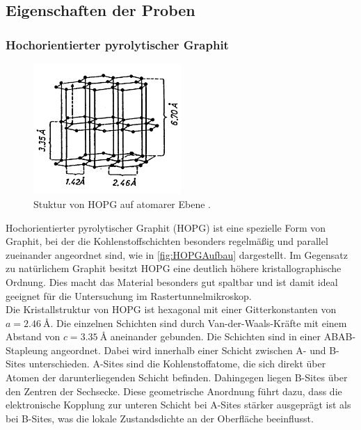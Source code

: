 \subsection{Eigenschaften der Proben}
\label{sec:EigenschaftenProben}

\subsubsection{Hochorientierter pyrolytischer Graphit}
\begin{figure}[h]
    \centering
    \includegraphics[width=0.5\textwidth]{Bilder/HOPGAufbau.png}
    \caption{Stuktur von HOPG auf atomarer Ebene \cite{ScanningTunnelingMicroscopy}.}
    \label{fig:HOPGAufbau}
\end{figure}
Hochorientierter pyrolytischer Graphit (HOPG) ist eine spezielle Form von Graphit, bei der die Kohlenstoffschichten besonders regelmäßig und parallel zueinander angeordnet sind, wie in \autoref{fig:HOPGAufbau} dargestellt. 
Im Gegensatz zu natürlichem Graphit besitzt HOPG eine deutlich höhere kristallographische Ordnung.
Dies macht das Material besonders gut spaltbar und ist damit ideal geeignet für die Untersuchung im Rastertunnelmikroskop.\\

Die Kristallstruktur von HOPG ist hexagonal mit einer Gitterkonstanten von $a = \SI{2.46}{\angstrom}$. 
Die einzelnen Schichten sind durch Van-der-Waals-Kräfte mit einem Abstand von $c = \SI{3.35}{\angstrom}$ aneinander gebunden. 
Die Schichten sind in einer ABAB-Stapleung angeordnet. Dabei wird innerhalb einer Schicht zwischen A- und B-Sites unterschieden.
A-Sites sind die Kohlenstoffatome, die sich direkt über Atomen der darunterliegenden Schicht befinden.
Dahingegen liegen B-Sites über den Zentren der Sechsecke.
Diese geometrische Anordnung führt dazu, dass die elektronische Kopplung zur unteren Schicht bei A-Sites stärker ausgeprägt ist als bei B-Sites, was die lokale Zustandsdichte an der Oberfläche beeinflusst.\\

